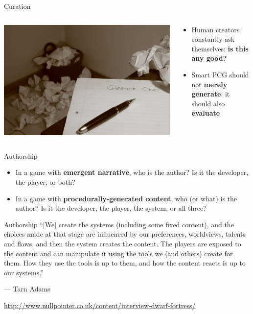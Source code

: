 \begin{frame}{Curation}
	\begin{columns}
		\begin{column}{0.4\textwidth}
			\pause\includegraphics[width=\textwidth]{curation}
		\end{column}
		\begin{column}{0.55\textwidth}
			\begin{itemize}
				\pause\item Human creators constantly ask themselves: \textbf{is this any good?}
				\pause\item Smart PCG should not \textbf{merely generate}: it should also
					\textbf{evaluate}
			\end{itemize}
		\end{column}
	\end{columns}
\end{frame}

\begin{frame}{Authorship}
	\begin{itemize}
		\pause\item In a game with \textbf{emergent narrative}, who is the author?
			Is it the developer, the player, or both?
		\pause\item In a game with \textbf{procedurally-generated content}, who (or what) is the author?
			Is it the developer, the player, the system, or all three?
	\end{itemize}
\end{frame}

\begin{frame}{Authorship}
	``[We] create the systems (including some fixed content), and the choices made at that stage
	are influenced by our preferences, worldviews, talents and flaws, and then the system creates the content.
	The players are exposed to the content and can manipulate it using the tools we (and others) create for them.
	How they use the tools is up to them, and how the content reacts is up to our systems.''
	
	--- Tarn Adams
	
	{\tiny\url{http://www.nullpointer.co.uk/content/interview-dwarf-fortress/}}
\end{frame}

